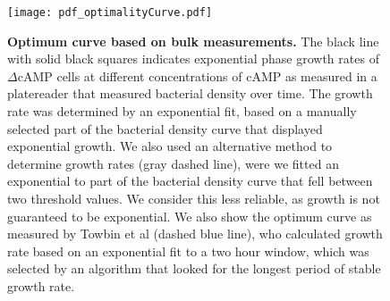\begin{figure}
    \centering
    \texttt{[image: pdf\_optimalityCurve.pdf]}
    \caption{ 
        \textbf{Optimum curve based on bulk measurements.}
        The black line with solid black squares indicates
        exponential phase growth rates of $\Delta$cAMP cells at different concentrations of cAMP as measured in a platereader that measured bacterial density over time.
        The growth rate was determined by an exponential fit, based on a manually selected part of the bacterial density curve that displayed exponential growth.
        We also used an alternative method to determine growth rates (gray dashed line), were we 
        fitted an exponential to part of the bacterial density curve that fell between two threshold values.
        We consider this less reliable, as growth is not guaranteed to be exponential.
        We also show the optimum curve as measured by Towbin et al \cite{Towbin2017} (dashed blue line),
        who calculated growth rate based on an exponential fit to a two hour window,
        which was selected by an algorithm that looked for the longest period of stable growth rate.        
    }
    \label{fig:CRP:ocurvePlatereader}
\end{figure}


